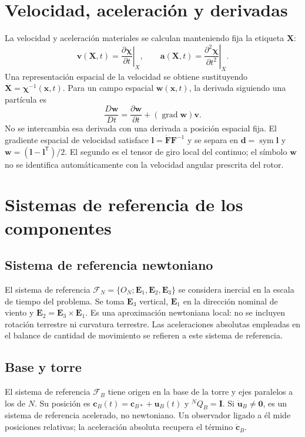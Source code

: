 \documentclass[11pt,a4paper,oneside]{report}
\newcommand{\vct}[1]{\bm{#1}}
\newcommand{\ten}[1]{\boldsymbol{#1}}
\newcommand{\Id}{\mathbf I}
\newcommand{\tr}{\mathsf T}
\newcommand{\grad}{\operatorname{grad}}
\newcommand{\sym}{\operatorname{sym}}
\begin{document}
\section{Velocidad, aceleración y derivadas}
La velocidad y aceleración materiales se calculan manteniendo fija la etiqueta $\vct X$:
\begin{equation}
 \vct v(\vct X,t)=\left.\frac{\partial\vct\chi}{\partial t}\right|_X,
 \qquad \vct a(\vct X,t)=\left.\frac{\partial^2\vct\chi}{\partial t^2}\right|_X.
\end{equation}
Una representación espacial de la velocidad se obtiene sustituyendo $\vct X=\vct\chi^{-1}(\vct x,t)$. Para un campo espacial $\vct w(\vct x,t)$, la derivada siguiendo una partícula es
\begin{equation}
 \frac{D\vct w}{Dt}=\frac{\partial\vct w}{\partial t}+(\grad\vct w)\vct v.
\end{equation}
No se intercambia esa derivada con una derivada a posición espacial fija. El gradiente espacial de velocidad satisface $\ten l=\dot{\ten F}\ten F^{-1}$ y se separa en $\ten d=\sym\ten l$ y $\ten w=(\ten l-\ten l^\tr)/2$. El segundo es el tensor de giro local del continuo; el símbolo $\ten w$ no se identifica automáticamente con la velocidad angular prescrita del rotor.

\section{Sistemas de referencia de los componentes}
\subsection{Sistema de referencia newtoniano}
El sistema de referencia $\mathcal F_N=\{O_N;\vct E_1,\vct E_2,\vct E_3\}$ se considera inercial en la escala de tiempo del problema. Se toma $\vct E_3$ vertical, $\vct E_1$ en la dirección nominal de viento y $\vct E_2=\vct E_3\times\vct E_1$. Es una aproximación newtoniana local: no se incluyen rotación terrestre ni curvatura terrestre. Las aceleraciones absolutas empleadas en el balance de cantidad de movimiento se refieren a este sistema de referencia.

\subsection{Base y torre}
El sistema de referencia $\mathcal F_B$ tiene origen en la base de la torre y ejes paralelos a los de $N$. Su posición es $\vct c_B(t)=\vct c_{B*}+\vct u_B(t)$ y ${}^NQ_B=\Id$. Si $\ddot{\vct u}_B\ne\vct0$, es un sistema de referencia acelerado, no newtoniano. Un observador ligado a él mide posiciones relativas; la aceleración absoluta recupera el término $\ddot{\vct c}_B$.
\end{document}
